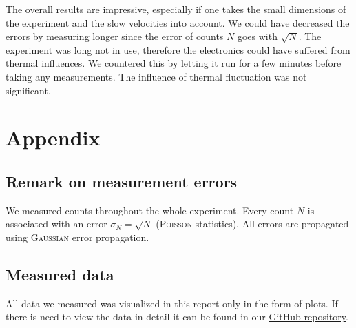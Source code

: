 \documentclass[11pt,a4paper,notitlepage]{scrartcl}
\begin{document}
The overall results are impressive, especially if one takes the small dimensions of the experiment and the slow velocities into account. We could have decreased the errors by measuring longer since the error of counts $N$ goes with $\sqrt{N}$. The experiment was long not in use, therefore the electronics could have suffered from thermal influences. We countered this by letting it run for a few minutes before taking any measurements. The influence of thermal fluctuation was not significant.
\newpage
\section{Appendix}

\subsection{Remark on measurement errors}
We measured counts throughout the whole experiment. Every count $N$ is associated with an error $\sigma_N=\sqrt{N}$ (\textsc{Poisson} statistics). All errors are propagated using \textsc{Gaussian} error propagation.


\subsection{Measured data}
All data we measured was visualized in this report only in the form of plots. If there is need to view the data in detail it can be found in our \href{https://github.com/krausejm/advanced_lab_course}{GitHub repository}. 
\end{document}
